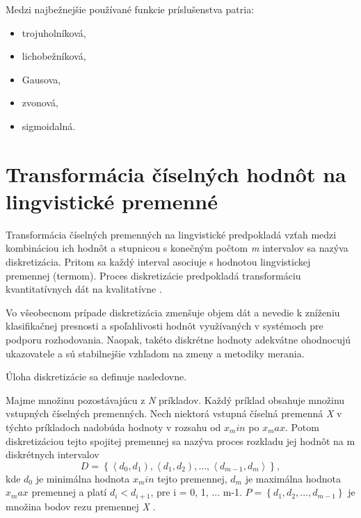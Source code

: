 Medzi najbežnejšie používané funkcie príslušenstva patria: 
\begin{itemize}
	\item trojuholníková, 
	\item lichobežníková, 
	\item Gausova, 
	\item zvonová, 
	\item sigmoidalná. 
\end{itemize}




\section{Transformácia číselných hodnôt na lingvistické premenné}
Transformácia číselných premenných na lingvistické predpokladá vzťah medzi kombináciou ich hodnôt a stupnicou s konečným počtom \textit{m} intervalov sa nazýva diskretizácia. 
Pritom sa každý interval asociuje s hodnotou lingvistickej premennej (termom). Proces diskretizácie predpokladá transformáciu kvantitatívnych dát na kvalitatívne \cite{levashenkoProj, Catlett1991}.


Vo všeobecnom prípade diskretizácia zmenšuje objem dát a nevedie k zníženiu klasifikačnej presnosti a spoľahlivosti hodnôt  využívaných v systémoch pre podporu rozhodovania. Naopak, takéto diskrétne hodnoty adekvátne ohodnocujú ukazovatele a sú stabilnejšie vzhľadom na zmeny a metodiky merania\cite{levashenkoProj, Lui2002}. 



Úloha diskretizácie sa definuje nasledovne. 

\begin{defn} Majme množinu pozostávajúcu z \textit{N} príkladov. Každý príklad obsahuje množinu vstupných číselných premenných. Nech niektorá vstupná číselná premenná \textit{X} v týchto príkladoch nadobúda hodnoty v rozsahu od $x_min$ po $x_max$. Potom diskretizáciou tejto spojitej premennej sa nazýva proces rozkladu jej hodnôt na m diskrétnych intervalov
\begin{equation}\label{dkiskr}
D =\left\lbrace
\left\langle d_0, d_1 \right) , 
\left\langle d_1, d_2 \right) , ... , 
\left\langle d_{m-1}, d_m \right\rangle 
 \right\rbrace, 
\end{equation} 
kde $d_0$ je minimálna hodnota $x_min$ tejto premennej, $d_m$ je maximálna hodnota $x_max$ premennej a platí $d_i < d_{i+1}$, pre i = 0, 1, ... m-1. 
$P = \left\lbrace d_1, d_2, ..., d_{m-1} \right\rbrace$ je množina bodov rezu premennej \textit{X}    \cite{levashenkoProj, Garcia2013}.
\end{defn} 

